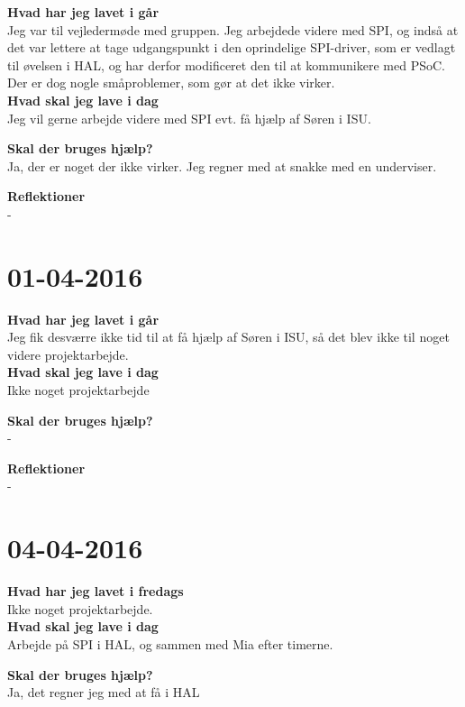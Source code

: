 \documentclass{article}
\begin{document}
	\textbf{Hvad har jeg lavet i går}\\
	Jeg var til vejledermøde med gruppen.
	Jeg arbejdede videre med SPI, og indså at det var lettere at tage udgangspunkt i den oprindelige SPI-driver, som er vedlagt til øvelsen i HAL, og har derfor modificeret den til at kommunikere med PSoC. Der er dog nogle småproblemer, som gør at det ikke virker.\\
	
	\textbf{Hvad skal jeg lave i dag}\\
	Jeg vil gerne arbejde videre med SPI evt. få hjælp af Søren i ISU.
	
	\textbf{Skal der bruges hjælp?}\\
	Ja, der er noget der ikke virker. Jeg regner med at snakke med en underviser.
	
	\textbf{Reflektioner}\\
	-
	
	
	
	\section{01-04-2016}
	
	\textbf{Hvad har jeg lavet i går}\\
	Jeg fik desværre ikke tid til at få hjælp af Søren i ISU, så det blev ikke til noget videre projektarbejde.\\
	
	\textbf{Hvad skal jeg lave i dag}\\
	Ikke noget projektarbejde
	
	\textbf{Skal der bruges hjælp?}\\
	-
	
	\textbf{Reflektioner}\\
	-
	
	
	\section{04-04-2016}
	
	\textbf{Hvad har jeg lavet i fredags}\\
	Ikke noget projektarbejde.\\
	
	\textbf{Hvad skal jeg lave i dag}\\
	Arbejde på SPI i HAL, og sammen med Mia efter timerne.
	
	\textbf{Skal der bruges hjælp?}\\
	Ja, det regner jeg med at få i HAL
	
\end{document}

